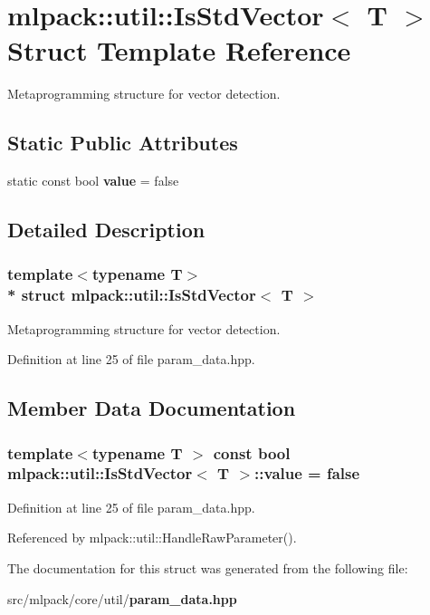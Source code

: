 \section{mlpack\+:\+:util\+:\+:Is\+Std\+Vector$<$ T $>$ Struct Template Reference}
\label{structmlpack_1_1util_1_1IsStdVector}


Metaprogramming structure for vector detection.  


\subsection*{Static Public Attributes}
\begin{DoxyCompactItemize}
\item 
static const bool {\bf value} = false
\end{DoxyCompactItemize}


\subsection{Detailed Description}
\subsubsection*{template$<$typename T$>$\\*
struct mlpack\+::util\+::\+Is\+Std\+Vector$<$ T $>$}

Metaprogramming structure for vector detection. 

Definition at line 25 of file param\+\_\+data.\+hpp.



\subsection{Member Data Documentation}
\subsubsection[{value}]{\setlength{\rightskip}{0pt plus 5cm}template$<$typename T $>$ const bool {\bf mlpack\+::util\+::\+Is\+Std\+Vector}$<$ T $>$\+::value = false\hspace{0.3cm}{\ttfamily [static]}}\label{structmlpack_1_1util_1_1IsStdVector_a180bdd2403be905a27893324de8f9d33}


Definition at line 25 of file param\+\_\+data.\+hpp.



Referenced by mlpack\+::util\+::\+Handle\+Raw\+Parameter().



The documentation for this struct was generated from the following file\+:\begin{DoxyCompactItemize}
\item 
src/mlpack/core/util/{\bf param\+\_\+data.\+hpp}\end{DoxyCompactItemize}
